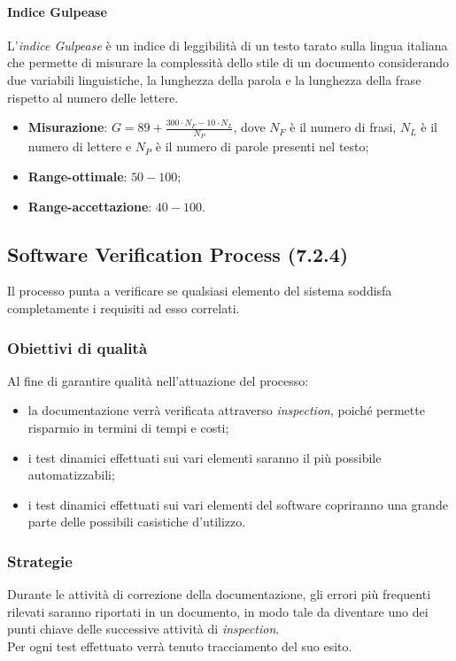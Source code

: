 \paragraph{Indice Gulpease}
L'\textit{indice Gulpease} è un indice di leggibilità di un testo tarato sulla lingua italiana che permette di misurare la complessità dello stile di un documento considerando due variabili linguistiche, la lunghezza della parola e la lunghezza della frase rispetto al numero delle lettere.
\begin{itemize}
\item \textbf{Misurazione}: $G = 89 + \frac{300\cdot{}N_{F}-10\cdot{}N_{L}}{N_{P}}$, dove $N_{F}$ è il numero di frasi, $N_{L}$ è il numero di lettere e $N_{P}$ è il numero di parole presenti nel testo;
\item \textbf{Range-ottimale}: $50 - 100$;
\item \textbf{Range-accettazione}: $40 - 100$.
\end{itemize}

\subsection{Software Verification Process (7.2.4)}
Il processo punta a verificare se qualsiasi elemento del sistema soddisfa completamente i requisiti ad esso correlati.
\subsubsection{Obiettivi di qualità}
Al fine di garantire qualità nell'attuazione del processo:
\begin{itemize}
\item la documentazione verrà verificata attraverso \textit{inspection}, poiché permette risparmio in termini di tempi e costi;
\item i test dinamici effettuati sui vari elementi saranno il più possibile automatizzabili;
\item i test dinamici effettuati sui vari elementi del software copriranno una grande parte delle possibili casistiche d'utilizzo.
\end{itemize}
\subsubsection{Strategie}
Durante le attività di correzione della documentazione, gli errori più frequenti rilevati saranno riportati in un documento, in modo tale da diventare uno dei punti chiave delle successive attività di \textit{inspection}.\\
Per ogni test effettuato verrà tenuto tracciamento del suo esito.

